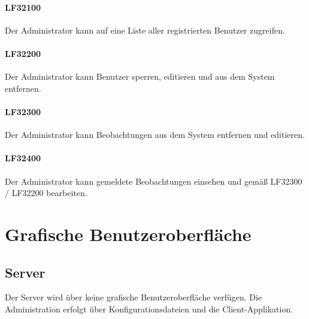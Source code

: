 \documentclass[a4paper,11pt]{scrartcl}
\begin{document}
			\paragraph{LF32100}
				Der Administrator kann auf eine Liste aller registrierten Benutzer zugreifen.
			\paragraph{LF32200}
				Der Administrator kann Benutzer sperren, editieren und aus dem System entfernen.
			\paragraph{LF32300}
				Der Administrator kann Beobachtungen aus dem System entfernen und editieren.
			\paragraph{LF32400}
				Der Administrator kann gemeldete Beobachtungen einsehen und gemäß LF32300 / LF32200 bearbeiten.

\section{Grafische Benutzeroberfläche}
	\subsection{Server}
		Der Server wird über keine grafische Benutzeroberfläche verfügen. Die Administration erfolgt über Konfigurationsdateien und die Client-Applikation.
\end{document}
